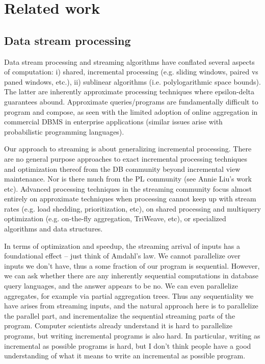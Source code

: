 \section{Related work}

\subsection{Data stream processing}

Data stream processing and streaming algorithms have conflated several aspects of computation: i) shared, incremental processing (e.g. sliding windows, paired vs paned windows, etc.), ii) sublinear algorithms (i.e. polylogarithmic space bounds). The latter are inherently approximate processing techniques where epsilon-delta guarantees abound. Approximate queries/programs are fundamentally difficult to program and compose, as seen with the limited adoption of online aggregation in commercial DBMS in enterprise applications (similar issues arise with probabilistic programming languages).

Our approach to streaming is about generalizing incremental processing. There are no general purpose approaches to exact incremental processing techniques and optimization thereof from the DB community beyond incremental view maintenance. Nor is there much from the PL community (see Annie Liu's work etc). Advanced processing techniques in the streaming community focus almost entirely on approximate techniques when processing cannot keep up with stream rates (e.g. load shedding, prioritization, etc), on shared processing and multiquery optimization (e.g. on-the-fly aggregation, TriWeave, etc), or specialized algorithms and data structures.

In terms of optimization and speedup, the streaming arrival of inputs has a foundational effect -- just think of Amdahl's law. We cannot parallelize over inputs we don't have, thus a some fraction of our program is sequential. However, we can ask whether there are any inherently sequential computations in database query languages, and the answer appears to be no. We can even parallelize aggregates, for example via partial aggregation trees. Thus any sequentiality we have arises from streaming inputs, and the natural approach here is to parallelize the parallel part, and incrementalize the sequential streaming parts of the program. Computer scientists already understand it is hard to parallelize programs, but writing incremental programs is also hard. In particular, writing as incremental as possible programs is hard, but I don't think people have a good understanding of what it means to write an incremental as possible program.



